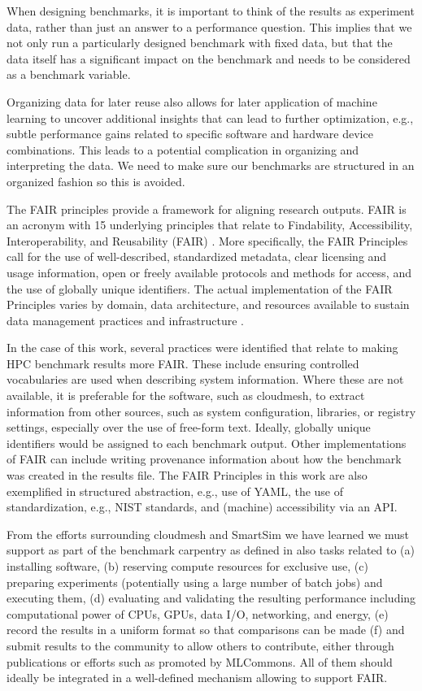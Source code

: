 \documentclass[utf8]{FrontiersinVancouver} %
\begin{document}
When designing benchmarks, it is important to think of the results as experiment data, rather than just an answer to a performance question. 
This implies that we not only run a particularly designed benchmark with fixed data, but that the data itself has a significant impact on the benchmark and needs to be considered as a benchmark variable.

Organizing data for later reuse also allows for later application of machine learning to uncover additional insights that can lead to further optimization, e.g., subtle performance gains related to specific software and hardware device combinations. 
This leads to a potential complication in organizing and interpreting the data. We need to make sure our benchmarks are structured in an organized fashion so this is avoided.

The FAIR principles provide a framework for aligning research outputs. FAIR is an acronym with 15 underlying principles that relate to Findability, Accessibility, Interoperability, and Reusability (FAIR) \citep{wilkinson2016fair}. More specifically, the FAIR Principles call for the use of well-described, standardized metadata, clear licensing and usage information, open or freely available protocols and methods for access, and the use of globally unique identifiers. The actual implementation of the FAIR Principles varies by domain, data architecture, and resources available to sustain data management practices and infrastructure \citep{jacobsen2020fair}.

In the case of this work, several practices were identified that relate to making HPC benchmark results more FAIR\citep{kirkpatrick2024}. These include ensuring controlled vocabularies are used when describing system information. Where these are not available, it is preferable for the software, such as cloudmesh, to extract information from other sources, such as system configuration, libraries, or registry settings, especially over the use of free-form text. Ideally, globally unique identifiers would be assigned to each benchmark output. Other implementations of FAIR can include writing provenance information about how the benchmark was created in the results file. The FAIR Principles in this work are also exemplified in structured abstraction, e.g., use of YAML, the use of standardization, e.g., NIST standards, and (machine) accessibility via an API. 

From the efforts surrounding cloudmesh and SmartSim we have learned we must support as part of the benchmark carpentry as defined in \citep{las-frontiers-edu} also tasks related to  (a) installing software, (b) reserving compute resources for exclusive use, (c) preparing experiments (potentially using a large number of batch jobs) and executing them, (d) evaluating and validating the resulting performance including computational power of CPUs, GPUs, data I/O, networking, and energy, (e) record the results in a uniform format so that comparisons can be made (f) and submit results to the community to allow others to contribute, either through publications or efforts such as promoted by MLCommons. All of them should ideally be integrated in a well-defined mechanism allowing to support FAIR.
\end{document}
